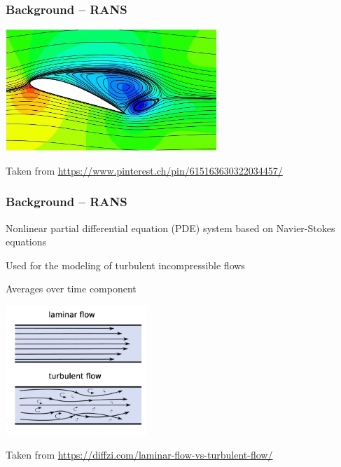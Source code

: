 \begin{frame}
    \frametitle{Background -- RANS}
	\vspace*{8mm}
\includegraphics[width=0.6\textwidth, height=.55\textheight]{./Ressourcen/Praesentation/Bilder/streamlines.jpg}

Taken from \url{https://www.pinterest.ch/pin/615163630322034457/}
\end{frame}
\clearpage

\begin{frame}
    \frametitle{Background -- RANS}
	\vspace*{8mm}
\begin{multicols}{2}
Nonlinear partial differential equation (PDE) system \newline
based on Navier-Stokes equations

Used for the modeling of turbulent incompressible flows

Averages over time component

\vfill\columnbreak
\includegraphics[width=0.4\textwidth, height=.55\textheight]{./Ressourcen/Praesentation/Bilder/laminar_turbulent.png}

\end{multicols}
\vspace*{-4mm}
Taken from \url{https://diffzi.com/laminar-flow-vs-turbulent-flow/}
\end{frame}
\clearpage

